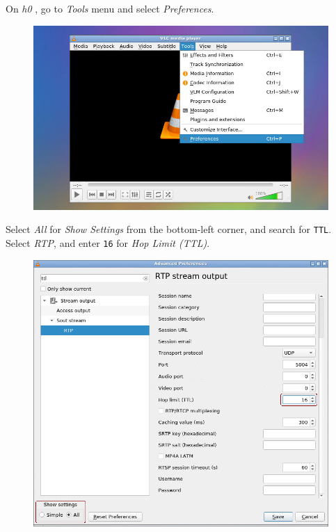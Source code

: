 \documentclass{../UTNetLab}
\begin{document}
On \textit{h0} , go to \textit{Tools} menu and select \textit{Preferences}.
\begin{figure}[H]
    \centering
    \includegraphics[scale=2]{img/open-pref}
\end{figure}
Select \textit{All} for \textit{Show Settings} from the bottom-left corner,
and search for \texttt{TTL}.
Select \textit{RTP},
and enter \texttt{16} for \textit{Hop Limit (TTL)}.
\begin{figure}[H]
    \centering
    \includegraphics[scale=2.2]{img/pref}
\end{figure}
\end{document}
